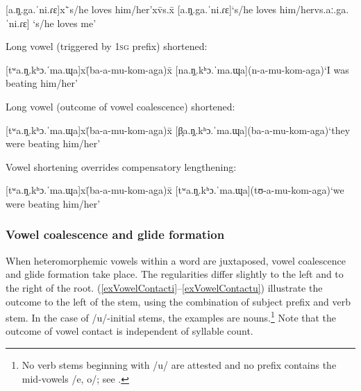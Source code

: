 \begin{exe}
	\ex
	\begin{xlist}
		\sn
		\label{exNCvsSyllabicNasal}
		\begin{tabbing}
			{[}a.ŋ̩.ga.ˈni.ɾɛ{]}x\=`s/he loves him/her'x\=vs.x\=\kill
			{[}a.ŋ̩.ga.ˈni.ɾɛ{]}\>`s/he loves him/her\>vs.\>{[}aː.{\ᵑ}ga.ˈni.ɾɛ{]} `s/he loves me'
		\end{tabbing}
	\end{xlist}
	\ex \label{exVowelShortening} 
	\begin{xlist}
		\ex Long vowel (triggered by \textsc{1sg} prefix) shortened:
		\begin{tabbing}
			{[tʷa.ŋ̩.kʰɔ.ˈma.ɰa]}x\=(\degree ba-a-mu-kom-aga)x\=\kill
			{[na.ŋ̩.kʰɔ.ˈma.ɰa]}\>(\degree n-a-mu-kom-aga)\>`I was beating him/her'
		\end{tabbing}
		\ex Long vowel (outcome of vowel coalescence) shortened:
		\begin{tabbing}
			{[tʷa.ŋ̩.kʰɔ.ˈma.ɰa]}x\=(\degree ba-a-mu-kom-aga)x\=\kill
			{[β̞a.ŋ̩.kʰɔ.ˈma.ɰa]}\>(\degree ba-a-mu-kom-aga)\>`they were beating him/her'
		\end{tabbing}
		\ex Vowel shortening overrides compensatory lengthening:
		\begin{tabbing}
			{[tʷa.ŋ̩.kʰɔ.ˈma.ɰa]}x\=(\degree ba-a-mu-kom-aga)x\=\kill
			{[tʷa.ŋ̩.kʰɔ.ˈma.ɰa]}\>(\degree tʊ-a-mu-kom-aga)\>`we were beating him/her'
		\end{tabbing}
	\end{xlist}
\end{exe}

\subsubsection{Vowel coalescence and glide formation}\label{HiatusSolution}
When heteromorphemic vowels within a word are juxtaposed, vowel coalescence and glide formation take place. The regularities differ slightly to the left and to the right of the root. (\ref{exVowelContacti}--\ref{exVowelContactu}) illustrate the outcome to the left of the stem, using the combination of subject prefix and verb stem. In the case of /u/-initial stems, the examples are nouns.\footnote{No verb stems beginning with /u/ are attested and no prefix contains the mid-vowels /e, o/; see .} Note that the outcome of vowel contact is independent of syllable count.


